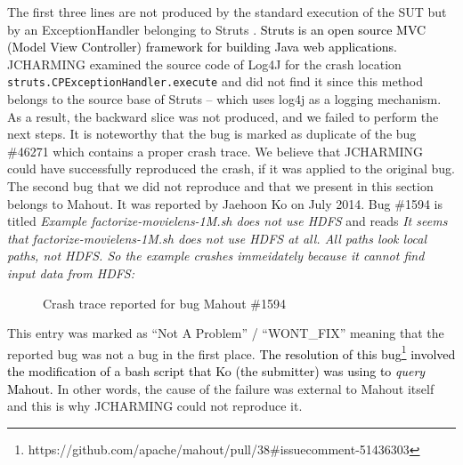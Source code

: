 \documentclass[times, doublespace]{smrauth}
\newcommand{\red}[1]{\textcolor{black}{#1}}
\begin{document}
The first three lines are not produced by the standard
execution of the SUT but by an ExceptionHandler belonging
to Struts \cite{ApacheSoftwareFoundation2000}. \red{Struts is an open source MVC (Model View
Controller) framework for building Java web applications.}
JCHARMING examined the source code of Log4J for the
crash location {\tt struts.CPExceptionHandler.execute} and did not
find it since this method belongs to the source base of Struts
-- which uses log4j as a logging mechanism. As a result, the
backward slice was not produced, and we failed to perform the
next steps. It is noteworthy that the bug is marked as duplicate
of the bug \#46271 which contains a proper crash trace. We
believe that JCHARMING could have successfully
reproduced the crash, if it was applied to the original bug. \\

The second bug that we did not reproduce and
that we present in this section belongs to Mahout. It was reported by
Jaehoon Ko on July 2014. Bug \#1594 is titled {\it Example factorize-movielens-1M.sh does not use HDFS}
and reads {\it It seems that factorize-movielens-1M.sh does not use HDFS at all.
All paths look local paths, not HDFS. So the example crashes
immeidately because it cannot find input data from HDFS: }

\begin{figure}[H]

\noindent{}

\caption{Crash trace reported for bug Mahout \#1594\label{fig:mahout2}}
\end{figure}

This entry was marked as ``Not A Problem'' / ``WONT\_FIX'' meaning that
the reported bug was not a bug in the first place.
\red{The resolution of this bug\footnote{https://github.com/apache/mahout/pull/38\#issuecomment-51436303}
involved the modification of a bash script that Ko (the submitter) was using to {\it query} Mahout.} In other words, the cause of the failure was external to Mahout itself and this is why JCHARMING could not reproduce it.
\end{document}
